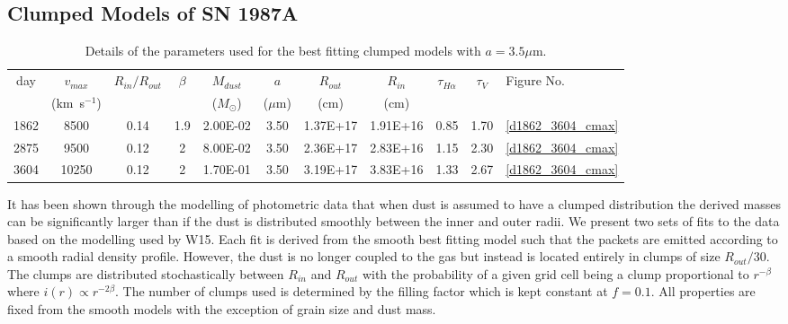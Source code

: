 \documentclass[useAMS,usenatbib,usegraphicx]{mnras}
\begin{document}
\subsection{Clumped Models of SN 1987A}
\label{clumped_models}
\begin{table}
	\begin{minipage}{180mm}
	\caption{Details of the parameters used for the best fitting clumped models with $a=3.5\mu$m.}
	\label{clumped2}
	\begin{center}
  	\begin{tabular}{@{} ccccccccccl @{}}
    	\hline
  day & $v_{max}$ & $R_{in}/R_{out}$ & $\beta$ & $M_{dust}$ & $a$ & $R_{out}$ & $R_{in}$ & $\tau_{H\alpha}$ & $\tau_V$ & Figure No. \\
	& (km~s$^{-1} $) & & & ($M_{\odot}$) & ($\mu$m) & (cm) & (cm)  \\
	\hline
1862 & 8500 & 0.14 & 1.9 & 2.00E-02 & 3.50 & 1.37E+17 & 1.91E+16 & 0.85 & 1.70 & \ref{d1862_3604_cmax} \\
2875 & 9500 & 0.12 & 2 & 8.00E-02 & 3.50 & 2.36E+17 & 2.83E+16 & 1.15 & 2.30 & \ref{d1862_3604_cmax} \\
3604 & 10250 & 0.12 & 2 & 1.70E-01 & 3.50 & 3.19E+17 & 3.83E+16 & 1.33 & 2.67 & \ref{d1862_3604_cmax} \\
    \hline
  \end{tabular}
  \end{center}
\end{minipage}
\end{table}

It has been shown through the modelling of photometric data that when dust 
is assumed to have a clumped distribution the derived masses can be 
significantly larger than if the dust is distributed smoothly between the 
inner and outer radii.  We present two sets of fits to the data based on 
the modelling used by W15.  Each fit is derived from the smooth best 
fitting model such that the packets are emitted according to a smooth 
radial density profile.  However, the dust is no longer coupled to the gas 
but instead is located entirely in clumps of size $R_{out}/30$.  The 
clumps are distributed stochastically between $R_{in}$ and $R_{out}$ with 
the probability of a given grid cell being a clump proportional to $r^{- 
\beta }$ where $i(r) \propto r^{-2 \beta}$.  The number of clumps used is 
determined by the filling factor which is kept constant at $f=0.1$.  All 
properties are fixed from the smooth models with the exception of grain 
size and dust mass.
\end{document}

